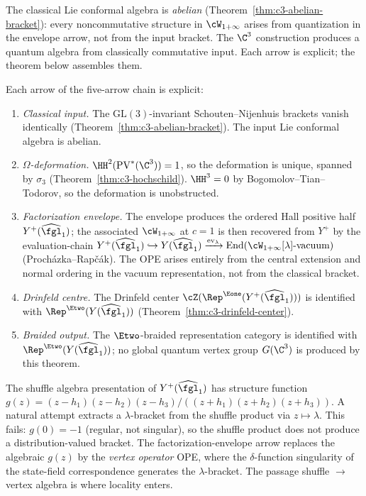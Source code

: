 The classical Lie conformal algebra is \emph{abelian} (Theorem~\ref{thm:c3-abelian-bracket}): every noncommutative structure in $\cW_{1+\infty}$ arises from quantization in the envelope arrow, not from the input bracket. The $\C^3$ construction produces a quantum algebra from classically commutative input. Each arrow is explicit; the theorem below assembles them.


\begin{theorem}[The \texorpdfstring{$d = 3$}{d = 3} functor chain for \texorpdfstring{$\C^3$}{C-3}]
\label{thm:c3-functor-chain}
Each arrow of the five-arrow chain is explicit:
\begin{enumerate}[label=(\roman*)]
 \item \emph{Classical input.} The $\mathrm{GL}(3)$-invariant Schouten--Nijenhuis brackets vanish identically (Theorem~\textup{\ref{thm:c3-abelian-bracket}}). The input Lie conformal algebra is abelian.
 \item \emph{$\Omega$-deformation.} $\HH^2(\mathrm{PV}^*(\C^3)) = 1$, so the deformation is unique, spanned by $\sigma_3$ (Theorem~\textup{\ref{thm:c3-hochschild}}). $\HH^3 = 0$ by Bogomolov--Tian--Todorov, so the deformation is unobstructed.
 \item \emph{Factorization envelope.} The envelope produces the ordered Hall positive half $Y^+(\widehat{\fgl}_1)$; the associated $\cW_{1+\infty}$ at $c = 1$ is then recovered from $Y^+$ by the evaluation-chain $Y^+(\widehat{\fgl}_1) \hookrightarrow Y(\widehat{\fgl}_1) \xrightarrow{\mathrm{ev}_\lambda} \mathrm{End}(\cW_{1+\infty}[\lambda]\text{-vacuum})$ \textup{(}Proch\'azka--Rap\v{c}\'ak\textup{).} The OPE arises entirely from the central extension and normal ordering in the vacuum representation, not from the classical bracket.
 \item \emph{Drinfeld centre.} The Drinfeld center $\cZ(\Rep^{\Eone}(Y^+(\widehat{\fgl}_1)))$ is identified with $\Rep^{\Etwo}(Y(\widehat{\fgl}_1))$ (Theorem~\textup{\ref{thm:c3-drinfeld-center}}).
 \item \emph{Braided output.} The $\Etwo$-braided representation category is identified with $\Rep^{\Etwo}(Y(\widehat{\fgl}_1))$; no global quantum vertex group $G(\C^3)$ is produced by this theorem.
\end{enumerate}
\end{theorem}


\begin{remark}
\label{rem:shuffle-no-direct-lambda}
The shuffle algebra presentation of $Y^+(\widehat{\fgl}_1)$ has structure function $g(z) = (z - h_1)(z - h_2)(z - h_3)/((z + h_1)(z + h_2)(z + h_3))$. A natural attempt extracts a $\lambda$-bracket from the shuffle product via $z \mapsto \lambda$. This fails: $g(0) = -1$ (regular, not singular), so the shuffle product does not produce a distribution-valued bracket. The factorization-envelope arrow replaces the algebraic $g(z)$ by the \emph{vertex operator} OPE, where the $\delta$-function singularity of the state-field correspondence generates the $\lambda$-bracket. The passage shuffle $\to$ vertex algebra is where locality enters.
\end{remark}


